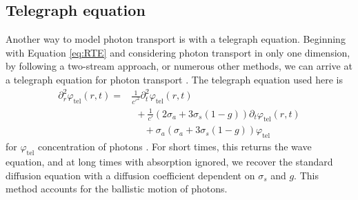 \documentclass[9pt,twocolumn,twoside]{opticajnl}
\begin{document}
\subsection{Telegraph equation}\label{subsec:teleg} 
Another way to model photon transport is with a telegraph equation. Beginning with Equation \ref{eq:RTE} and considering photon transport in only one dimension, by following a two-stream approach, or numerous other methods, we can arrive at a telegraph equation for photon transport \cite{schuster_radiation_1905,goldstein_diffusion_1951,durian_two-stream_1996,lemieux_diffusing-light_1998,das_non-fickian_1998,dudko_photon_2005,masoliver_solution_1993,masoliver_finite-velocity_1996,weiss_first_1984,weiss_applications_2002}. The telegraph equation used here is
\begin{align}
     \partial_{r}^{2} \varphi_{\textrm{tel}} \left(r,t\right)  = &\frac{1}{c'^{2}}\partial^{2}_{t} \varphi_{\textrm{tel}}\left(r,t\right) \nonumber \\
     &\ \ + \frac{1}{c'}\left(2 \sigma_{a} + 3 \sigma_{s} \left(1-g\right)\right) \partial_{t} \varphi_{\textrm{tel}}\left(r,t\right) \nonumber \\
    &\ \ \ \ \ \ + \sigma_{a}\left(\sigma_{a} + 3 \sigma_{s} \left(1-g\right)\right) \varphi_{\textrm{tel}} \label{eq:tel}
\end{align}
for $\varphi_{\textrm{tel}}$ concentration of photons \cite{lemieux_diffusing-light_1998}. For short times, this returns the wave equation, and at long times with absorption ignored, we recover the standard diffusion equation with a diffusion coefficient dependent on $\sigma_{s}$ and $g$. This method accounts for the ballistic motion of photons.
\end{document}
